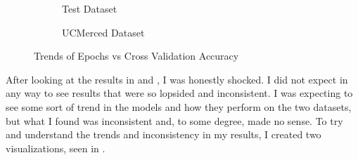 \documentclass[12pt]{article}
\begin{document}
	\begin{figure}[t!]
	\centering
		\begin{subfigure}[b]{0.4\linewidth}
			\centering
			\caption{Test Dataset}	
		\end{subfigure}
		\begin{subfigure}[b]{0.4\linewidth}
			\centering
			\caption{UCMerced Dataset}
			\label{fig:ucm_trend}
		\end{subfigure}
		\caption{Trends of Epochs vs Cross Validation Accuracy}
		\label{fig:result_graphs}
	\end{figure}
	
	After looking at the results in  and , I was honestly shocked. I did not expect in any way to see results that were so lopsided and inconsistent. I was expecting to see some sort of trend in the models and how they perform on the two datasets, but what I found was inconsistent and, to some degree, made no sense. To try and understand the trends and inconsistency in my results, I created two visualizations, seen in . 
	
\end{document}
